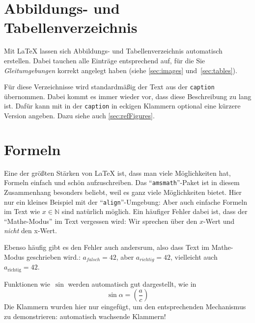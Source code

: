 \section{Abbildungs- und Tabellenverzeichnis}
\label{sec:captions}
Mit \LaTeX{} lassen sich Abbildungs- und Tabellenverzeichnis automatisch erstellen. Dabei tauchen alle Einträge entsprechend auf, für die Sie \emph{Gleitumgebungen} korrekt angelegt haben (siehe \cref{sec:images} und~\ref{sec:tables}).
\par
Für diese Verzeichnisse wird standardmäßig der Text aus der \texttt{caption} übernommen. Dabei kommt es immer wieder vor, dass diese Beschreibung zu lang ist. Dafür kann mit in der \texttt{caption} in eckigen Klammern optional eine kürzere Version angeben. Dazu siehe auch \cref{sec:refFigures}.
%
%
\section{Formeln}
\label{sec:formulas}
Eine der größten Stärken von \LaTeX{} ist, dass man viele Möglichkeiten hat, Formeln einfach und schön aufzuschreiben. Das \enquote{\texttt{amsmath}}-Paket ist in diesem Zusammenhang besonders beliebt, weil es ganz viele Möglichkeiten bietet. Hier nur ein kleines Beispiel mit der \enquote{\texttt{align}}-Umgebung:
%
%
Aber auch einfache Formeln im Text wie $x \in \mathbb{N}$ sind natürlich möglich. Ein häufiger Fehler dabei ist, dass der \enquote{Mathe-Modus} im Text vergessen wird: Wir sprechen über den $x$-Wert und \emph{nicht} den x-Wert.
\par
Ebenso häufig gibt es den Fehler auch andersrum, also dass Text im Mathe-Modus geschrieben wird.: $a_{falsch} = 42$, aber $a_{\mathit{richtig}} = 42$, vielleicht auch $a_{\text{richtig}} = 42$.
\par
Funktionen wie~$\sin$ werden automatisch gut dargestellt, wie in
%
\begin{equation}
\sin \alpha = \left( \frac{a}{c} \right)
\end{equation}
%
Die Klammern wurden hier nur eingefügt, um den entsprechenden Mechanismus zu demonstrieren: automatisch wachsende Klammern!
